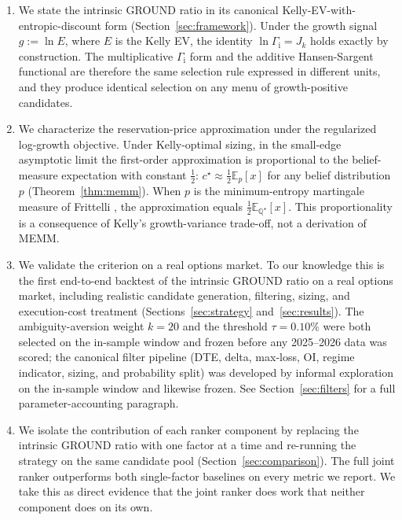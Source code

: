 \documentclass[11pt]{article}
\theoremstyle{definition}
\theoremstyle{remark}
\newcommand{\E}{\mathbb{E}}
\newcommand{\Q}{\mathbb{Q}}
\newcommand{\GROUND}{\Gamma_{\mathrm{i}}}
\begin{document}
\begin{enumerate}
    \item We state the intrinsic GROUND ratio in its canonical
          Kelly-EV-with-entropic-discount form
          (Section~\ref{sec:framework}). Under the growth signal $g
          := \ln E$, where $E$ is the Kelly EV, the identity
          $\ln \GROUND = J_k$ holds exactly by construction. The
          multiplicative $\GROUND$ form and the additive Hansen-Sargent
          functional are therefore the same selection rule expressed
          in different units, and they produce identical selection on
          any menu of growth-positive candidates.
    \item We characterize the reservation-price approximation under
          the regularized log-growth objective. Under Kelly-optimal sizing,
          in the small-edge asymptotic limit the first-order approximation is
          proportional to the belief-measure expectation with constant $\tfrac{1}{2}$: $c^\star \approx \tfrac{1}{2} \E_p[x]$
          for any belief distribution $p$ (Theorem~\ref{thm:memm}). When $p$ is the
          minimum-entropy martingale measure of Frittelli \cite{frittelli2000}, the approximation equals
          $\tfrac{1}{2}\E_{\Q^\star}[x]$. This proportionality is a consequence of Kelly's growth-variance trade-off, not a derivation of MEMM.
    \item We validate the criterion on a real options market. To our
          knowledge this is the first end-to-end backtest of the
          intrinsic GROUND ratio on a real options market,
          including realistic candidate generation, filtering,
          sizing, and execution-cost treatment
          (Sections~\ref{sec:strategy} and~\ref{sec:results}). The
          ambiguity-aversion weight $k = 20$ and the threshold
          $\tau = 0.10\%$ were both selected on the in-sample
          window and frozen before any 2025--2026 data was scored;
          the canonical filter pipeline (DTE, delta, max-loss, OI,
          regime indicator, sizing, and probability split)
          was developed by informal exploration on the in-sample
          window and likewise frozen. See
          Section~\ref{sec:filters} for a full
          parameter-accounting paragraph.
    \item We isolate the contribution of each ranker component by
          replacing the intrinsic GROUND ratio with one factor at a
          time and re-running
          the strategy on the same candidate pool
          (Section~\ref{sec:comparison}). The full joint ranker
          outperforms both single-factor baselines on every metric
          we report. We take this as direct evidence that the joint
          ranker does work that neither component does on its own.
\end{enumerate}
\end{document}
